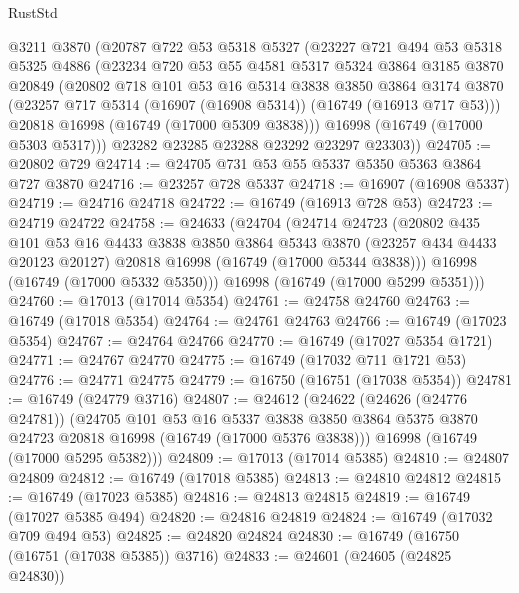 \begin{lexlean}{RustStd}
\begin{coremodule}
    @3211
    @3870
    (@20787
      @722
      @53
      @5318
      @5327
      (@23227
        @721
        @494
        @53
        @5318
        @5325
        @4886
        (@23234
          @720
          @53
          @55
          @4581
          @5317
          @5324
          @3864
          @3185
          @3870
          @20849
          (@20802
            @718
            @101
            @53
            @16
            @5314
            @3838
            @3850
            @3864
            @3174
            @3870
            (@23257 @717 @5314 (@16907 (@16908 @5314)) (@16749 (@16913 @717 @53)))
            @20818
            @16998
            (@16749 (@17000 @5309 @3838)))
          @16998
          (@16749 (@17000 @5303 @5317)))
        @23282
        @23285
        @23288
        @23292
        @23297
        @23303))
@24705 := @20802 @729
@24714 := @24705 @731 @53 @55 @5337 @5350 @5363 @3864 @727 @3870
@24716 := @23257 @728 @5337
@24718 := @16907 (@16908 @5337)
@24719 := @24716 @24718
@24722 := @16749 (@16913 @728 @53)
@24723 := @24719 @24722
@24758 := @24633
    (@24704
      (@24714
        @24723
        (@20802
          @435
          @101
          @53
          @16
          @4433
          @3838
          @3850
          @3864
          @5343
          @3870
          (@23257 @434 @4433 @20123 @20127)
          @20818
          @16998
          (@16749 (@17000 @5344 @3838)))
        @16998
        (@16749 (@17000 @5332 @5350)))
      @16998
      (@16749 (@17000 @5299 @5351)))
@24760 := @17013 (@17014 @5354)
@24761 := @24758 @24760
@24763 := @16749 (@17018 @5354)
@24764 := @24761 @24763
@24766 := @16749 (@17023 @5354)
@24767 := @24764 @24766
@24770 := @16749 (@17027 @5354 @1721)
@24771 := @24767 @24770
@24775 := @16749 (@17032 @711 @1721 @53)
@24776 := @24771 @24775
@24779 := @16750 (@16751 (@17038 @5354))
@24781 := @16749 (@24779 @3716)
@24807 := @24612
    (@24622
      (@24626 (@24776 @24781))
      (@24705
        @101
        @53
        @16
        @5337
        @3838
        @3850
        @3864
        @5375
        @3870
        @24723
        @20818
        @16998
        (@16749 (@17000 @5376 @3838)))
      @16998
      (@16749 (@17000 @5295 @5382)))
@24809 := @17013 (@17014 @5385)
@24810 := @24807 @24809
@24812 := @16749 (@17018 @5385)
@24813 := @24810 @24812
@24815 := @16749 (@17023 @5385)
@24816 := @24813 @24815
@24819 := @16749 (@17027 @5385 @494)
@24820 := @24816 @24819
@24824 := @16749 (@17032 @709 @494 @53)
@24825 := @24820 @24824
@24830 := @16749 (@16750 (@16751 (@17038 @5385)) @3716)
@24833 := @24601 (@24605 (@24825 @24830))

\end{coremodule}
\end{lexlean}
